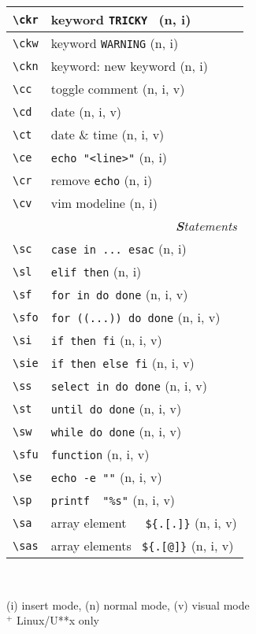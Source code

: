 \documentclass[oneside,12pt,a4paper,DIV18]{scrartcl}
\begin{document}
\begin{center}
\begin{tabular}[]{|p{11mm}|p{59mm}|}
\hline \verb'\ckr' & keyword \verb'TRICKY '           \hfill (n, i)\\
\hline \verb'\ckw' & keyword \verb'WARNING'           \hfill (n, i)\\
\hline \verb'\ckn' & keyword: new keyword             \hfill (n, i)\\
\hline \verb'\cc'  & toggle comment                   \hfill (n, i, v)\\
\hline \verb'\cd'  & date                             \hfill (n, i, v)\\
\hline \verb'\ct'  & date \& time                     \hfill (n, i, v)\\
\hline \verb'\ce'  & \verb'echo "<line>"'             \hfill (n, i)\\
\hline \verb'\cr'  & remove \verb'echo'               \hfill (n, i)\\
\hline \verb'\cv'  & vim modeline                     \hfill (n, i)\\
\hline 
\hline
\multicolumn{2}{|r|}{\textsl{\textbf{S}tatements}}\\
\hline \verb'\sc'  & \verb'case in ... esac'            \hfill (n, i)\\
\hline \verb'\sl'  & \verb'elif then'                   \hfill (n, i)\\
\hline \verb'\sf'  & \verb'for in do done'              \hfill (n, i, v)\\
\hline \verb'\sfo' & \verb'for ((...)) do done'         \hfill (n, i, v)\\
\hline \verb'\si'  & \verb'if then fi'                  \hfill (n, i, v)\\
\hline \verb'\sie' & \verb'if then else fi'             \hfill (n, i, v)\\
\hline \verb'\ss'  & \verb'select in do done'           \hfill (n, i, v)\\
\hline \verb'\st'  & \verb'until do done'               \hfill (n, i, v)\\
\hline \verb'\sw'  & \verb'while do done'               \hfill (n, i, v)\\
\hline \verb'\sfu' & \verb'function'                    \hfill (n, i, v)\\
\hline \verb'\se'  & \verb'echo -e ""'                  \hfill (n, i, v)\\
\hline \verb'\sp'  & \verb'printf  "%s"'                \hfill (n, i, v)\\
\hline \verb'\sa'  & array element\ \ \ \verb'${.[.]}'  \hfill (n, i, v)\\
\hline \verb'\sas' & array elements \ \verb'${.[@]}'    \hfill (n, i, v)\\
\hline
\end{tabular}\\
\begin{flushleft}
{\small
{\normalsize (i)} insert mode, {\normalsize (n)} normal mode, {\normalsize (v)} visual mode\\
$^+$ \footnotesize{Linux/U**x only}
}%
\end{flushleft}


\end{center}
\end{document}
